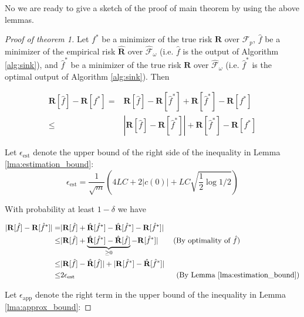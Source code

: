 \documentclass{article}
\begin{document}
No we are ready to give a sketch of the proof of main theorem by using the above lemmas.\\
\begin{proof}[Proof of theorem 1]
    Let $f^*$ be a minimizer of the true risk $\mathbf{R}$ over $\mathcal{F}_p$, $\hat{f}$ be a minimizer of the empirical risk $\hat{\mathbf{R}}$ over $\hat{\mathcal{F}}_\omega$ (i.e. $\hat{f}$ is the output of Algorithm \ref{alg:sink}), and $\hat{f}^*$ be a minimizer of the true risk $\mathbf{R}$ over $\hat{\mathcal{F}}_\omega$ (i.e. $\hat{f}^*$ is the optimal output of Algorithm \ref{alg:sink}). Then
    
    \begin{align}
        \mathbf{R}[\hat{f}]-\mathbf{R}[f^*] 
        =& \mathbf{R}[\hat{f}]-\mathbf{R}[\hat{f}^*]+\mathbf{R}[\hat{f}^*]-\mathbf{R}[f^*] \\
        \leq& |\mathbf{R}[\hat{f}]-\mathbf{R}[\hat{f}^*]|+\mathbf{R}[\hat{f}^*]-\mathbf{R}[f^*] 
    \end{align}
    
    Let $\epsilon_{\text{est}}$ denote the upper bound of the right side of the inequality in Lemma \ref{lma:estimation_bound}:
    \begin{equation*}
        \epsilon_{\text{est}}
        = \frac{1}{\sqrt{m}} \left(4LC + 2|c(0)| + LC \sqrt{\frac{1}{2} \log 1/2}\right) 
    \end{equation*}
    
    With probability at least $1-\delta$ we have
    
    \begin{align*}
        |\mathbf{R}[\hat{f}]-\mathbf{R}[\hat{f}^*]| 
           =& |\mathbf{R}[\hat{f}]+\hat{\mathbf{R}}[\hat{f}^*]
                -\hat{\mathbf{R}}[\hat{f}^*]-\mathbf{R}[\hat{f}^*]|\\
        \leq& |\mathbf{R}[\hat{f}]+\underbrace{\hat{\mathbf{R}}[\hat{f}^*]
                -\hat{\mathbf{R}}[\hat{f}]}_{\geq 0}-\mathbf{R}[\hat{f}^*]|\quad\quad \text{(By optimality of $\hat{f}$)}\\        
        \leq& |\mathbf{R}[\hat{f}]-\hat{\mathbf{R}}[\hat{f}]| + 
                |\mathbf{R}[\hat{f}^*]-\hat{\mathbf{R}}[\hat{f}^*]| \\
        \leq& 2\epsilon_{\text{est}} \hspace{135pt} \text{(By Lemma \ref{lma:estimation_bound})}
    \end{align*}
    
     Let $\epsilon_{\text{app}}$ denote the right term in the upper bound of the inequality in Lemma \ref{lma:approx_bound}:
     

\end{proof}
\end{document}
